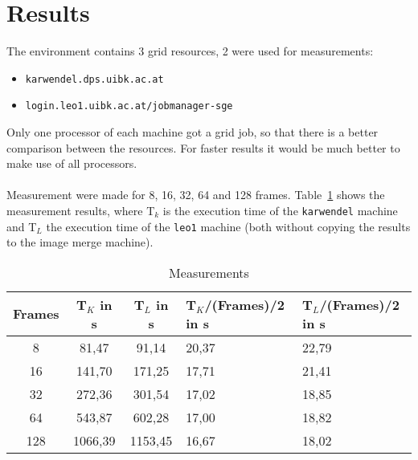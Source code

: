 \documentclass{article}
\begin{document}

\section{Results}

The environment contains 3 grid resources, 2 were used for measurements:

\begin{itemize}
\item \texttt{kar\-wen\-del.\-dps.\-uibk.\-ac.\-at} 
\item \texttt{login.\-leo1.\-uibk.\-ac.\-at/\-jobmanager-sge}
\end{itemize}

Only one processor of each machine got a grid job, so that there is a better comparison between the resources. For faster results it would be much better to make use of all processors.
\\
\\
Measurement were made for 8, 16, 32, 64 and 128 frames. Table~\ref{tab:measurements} shows the measurement results, where T$_k$ is the execution time of the \texttt{karwendel} machine and T$_L$ the execution time of the \texttt{leo1} machine (both without copying the results to the image merge machine).

\begin{table}[htbp]
\centering
\begin{tabular}{ | c | c | c | p{2.5cm} | p{2.5cm} |}
\hline
\textbf{Frames} & \textbf{T$_K$} in s & \textbf{T$_{L}$} in s & \textbf{T$_{K}$/(Frames)}/2 in s & \textbf{T$_{L}$/(Frames)}/2 in s \\
\hline \hline
8 & 81,47 & 91,14 & 20,37 & 22,79 \\
\hline
16 & 141,70 & 171,25 & 17,71 & 21,41 \\
\hline
32 & 272,36 & 301,54 & 17,02 & 18,85 \\
\hline
64 & 543,87 & 602,28 & 17,00 & 18,82 \\
\hline
128  & 1066,39 & 1153,45 & 16,67 & 18,02 \\
\hline
\end{tabular}
\caption{Measurements}
\label{tab:measurements}
\end{table}
\end{document}
